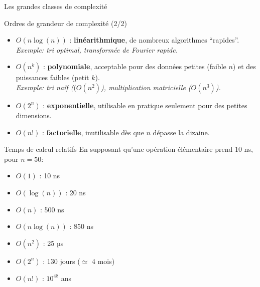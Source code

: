 \begin{frame}{Les grandes classes de complexité}
\begin{block}{Ordres de grandeur de complexité (2/2)}
\begin{itemize}
\item $O(n\log(n))$ : \textbf{linéarithmique}, de nombreux algorithmes ``rapides''.\\
	\textit{\small Exemple: tri optimal, transformée de Fourier rapide.}
\item $O(n^k)$ : \textbf{polynomiale}, acceptable pour des données petites (faible $n$) et des puissances faibles (petit $k$).\\
	\textit{\small Exemple: tri naïf ($(O(n^2)$), multiplication matricielle ($O(n^3)$).}
\item $O(2^n)$ : \textbf{exponentielle}, utilisable en pratique seulement pour des petites dimensions.
\item $O(n!)$ : \textbf{factorielle}, inutilisable dès que $n$ dépasse la dizaine.
\end{itemize}
\end{block}
\end{frame}

\begin{frame}{Temps de calcul relatifs}
En supposant qu'une opération élémentaire prend 10 ns, pour $n = 50$:
\begin{itemize}
    \item $O(1)$ : 10 ns
    \item $O(\log(n))$ : 20 ns
    \item $O(n)$ : 500 ns
    \item $O(n\log(n))$ : 850 ns
    \item $O(n^{2})$ : 25 µs
    \item $O(2^n)$ : 130 jours ($\simeq$ 4 mois)
    \item $O(n!)$ : $10^{48}$ ans 
\end{itemize}
\end{frame}


